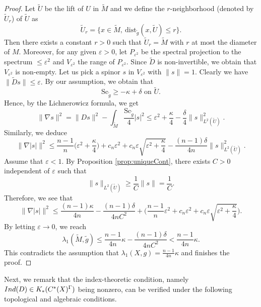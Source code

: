 \documentclass[12pt, reqno]{amsart}
\theoremstyle{plain}%
\theoremstyle{definition}
\theoremstyle{remark}
\numberwithin{equation}{section}
\newcommand{\Sc}{\mathrm{Sc}}
\newcommand{\dist}{\mathrm{dist}}
\newcommand{\ind}{\textup{Ind}}
\begin{document}
\begin{proof}
    Let $\widetilde U$ be the lift of $U$ in $\widetilde M$ and we define the $r$-neighborhood (denoted by $\widetilde U_r$) of $\widetilde U$ as
    \[\widetilde U_r = \{x \in \widetilde M, \ \dist_{\widetilde g}(x, \widetilde U) \leq r\}.\]
    Then there exists a constant $r> 0$ such that $\widetilde U_r = \widetilde M$ with $r$ at most the diameter of $M$. Moreover, for  any given $\varepsilon>0$, let $P_{\varepsilon^2}$ be the spectral projection to the spectrum $\leq\varepsilon^2$ and $V_{\varepsilon^2}$ the range of $P_{\varepsilon^2}$. Since $\widetilde D$ is non-invertible,  we obtain that $V_{\varepsilon^2}$ is non-empty. Let us pick a spinor $s$ in $V_{\varepsilon^2}$ with $\|s\|=1$. Clearly we have $\|\widetilde Ds\|\leq\varepsilon.$  By our assumption, we obtain that  $$\Sc_{\widetilde g}\geq -\kappa+\delta  \text{ on } \widetilde U.$$ Hence, by the Lichnerowicz formula, we get
	$$\|\nabla s\|^2=\|D s\|^2-\int_{\widetilde M}\frac{\Sc_{\widetilde g}}{4}|s|^2\leq \varepsilon^2+\frac{\kappa}{4}-\frac{\delta}{4}\|s\|^2_{L^2(\widetilde U)}.$$
	Similarly, we deduce
	$$\Big\|\nabla|s|\Big\|^2
	\leq \frac{n-1}{n}\big(\varepsilon^2+\frac{\kappa}{4}\big)+c_n\varepsilon^2+c_n\varepsilon\sqrt{\varepsilon^2+\frac{\kappa}{4}}-\frac{(n-1)\delta}{4n}\|s\|^2_{L^2(\widetilde U)}.$$
	Assume that $\varepsilon<1$. By Proposition \ref{prop:uniqueCont}, there exists $C>0$ independent of $\varepsilon$ such that
	$$\|s\|_{L^2(\widetilde U)}\geq \frac 1 C\|s\|=\frac 1 C.$$
	Therefore, we see that
	$$\Big\|\nabla|s|\Big\|^2
	\leq\frac{(n-1)\kappa}{4n}-\frac{(n-1)\delta}{4nC^2}+\Big(	
	\frac{n-1}{n}\varepsilon^2+c_n\varepsilon^2+c_n\varepsilon\sqrt{\varepsilon^2+\frac{\kappa}{4}}\Big).$$
	By letting $\varepsilon\to 0$, we reach
	$$\lambda_1(\widetilde M,\widetilde g)\leq  \frac{n-1}{4n}\kappa-\frac{(n-1)\delta}{4nC^2}<\frac{n-1}{4n}\kappa.$$
	This contradicts the assumption that $\lambda_1(X,g)=\frac{n-1}{4n}\kappa$ and finishes the proof.
\end{proof}



Next, we remark that the index-theoretic condition, namely $\ind(D) \in K_*(C^*(X)^\Gamma)$ being nonzero, can be verified under the following topological and algebraic conditions.
\end{document}
